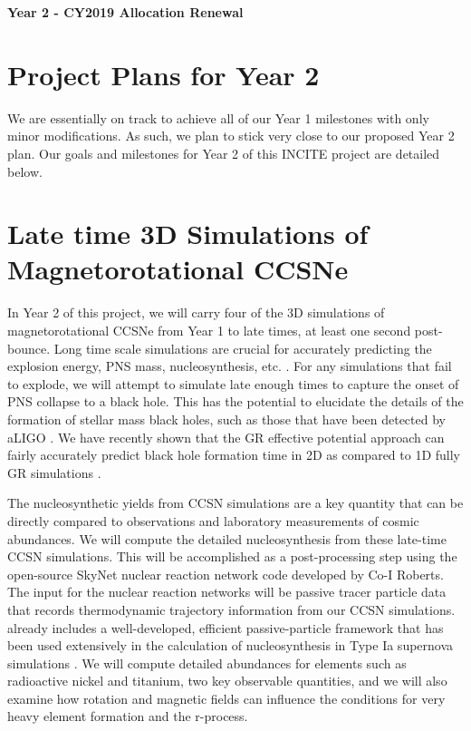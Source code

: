 \documentclass[12pt]{article}
\begin{document}
\begin{center}
{\bf Year 2 - CY2019 Allocation Renewal} \vspace{-0.1in}
\end{center}

\section*{Project Plans for Year 2}

We are essentially on track to achieve all of our Year 1 milestones with only minor modifications. 
As such, we plan to stick very close to our proposed Year 2 plan. 
Our goals and milestones for Year 2 of this INCITE project are detailed below.

\section{Late time 3D Simulations of Magnetorotational CCSNe}
\label{sec:Y2late}

In Year 2 of this project, we will carry four of the 3D simulations of magnetorotational CCSNe from Year 1 to late times, at least one second post-bounce.
Long time scale simulations are crucial for accurately predicting the explosion energy, PNS mass, nucleosynthesis, etc. \citep{bruenn:2016, muller:2017}.
For any simulations that fail to explode, we will attempt to simulate late enough times to capture the onset of PNS collapse to a black hole.
This has the potential to elucidate the details of the formation of stellar mass black holes, such as those that have been detected by aLIGO \citep{abbott:2016, abbott:2017}.
We have recently shown \citep{pan:2018} that the GR effective potential approach can fairly accurately predict black hole formation time in 2D as compared to 1D fully GR simulations \citep{oconnor:2011}.

The nucleosynthetic yields from CCSN simulations are a key quantity that can be directly compared to observations and laboratory measurements of cosmic abundances.
We will compute the detailed nucleosynthesis from these late-time CCSN simulations.
This will be accomplished as a post-processing step using the open-source SkyNet nuclear reaction network code developed by Co-I Roberts.
The input for the nuclear reaction networks will be passive tracer particle data that records thermodynamic trajectory information from our \flash CCSN simulations.
\flash already includes a well-developed, efficient passive-particle framework that has been used extensively in the calculation of nucleosynthesis in Type Ia supernova simulations \citep[e.g.,][]{Long:2014}.
We will compute detailed abundances for elements such as radioactive nickel and titanium, two key observable quantities, and we will also examine how rotation and magnetic fields can influence the conditions for very heavy element formation and the r-process.
\end{document}
